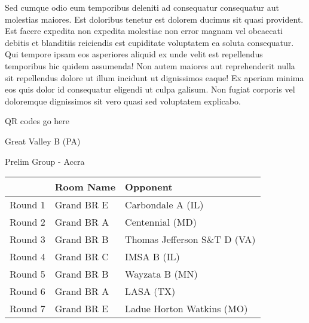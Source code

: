 \documentclass{article}%
\begin{document}
\newline%
Sed cumque odio eum temporibus deleniti ad consequatur consequatur aut molestias maiores. Est doloribus tenetur est dolorem ducimus sit quasi provident. Est facere expedita non expedita molestiae non error magnam vel obcaecati debitis et blanditiis reiciendis est cupiditate voluptatem ea soluta consequatur. Qui tempore ipsam eos asperiores aliquid ex unde velit est repellendus temporibus hic quidem assumenda!\newline%
\newline%
Non autem maiores aut reprehenderit nulla sit repellendus dolore ut illum incidunt ut dignissimos eaque! Ex aperiam minima eos quis dolor id consequatur eligendi ut culpa galisum. Non fugiat corporis vel doloremque dignissimos sit vero quasi sed voluptatem explicabo.\newline%
\newline%
%
\vspace*{30pt}%
\begin{center}%
\begin{Huge}%
QR codes go here%
\end{Huge}%
\end{center}%
\newpage%
%
\begin{center}%
\begin{Huge}%
Great Valley B (PA)%
\end{Huge}%
\vspace*{8pt}%
\linebreak%
\begin{Large}%
Prelim Group {-} Accra%
\end{Large}%
\end{center}%
\begin{tabularx}{\textwidth}{|c|Y|Y|}%
\hline%
&Room Name&Opponent\\%
\hline%
Round 1&Grand BR E&Carbondale A (IL)\\%
Round 2&Grand BR A&Centennial (MD)\\%
Round 3&Grand BR B&Thomas Jefferson S\&T D (VA)\\%
Round 4&Grand BR C&IMSA B (IL)\\%
Round 5&Grand BR B&Wayzata B (MN)\\%
Round 6&Grand BR A&LASA (TX)\\%
Round 7&Grand BR E&Ladue Horton Watkins (MO)\\%
\hline%
\end{tabularx}%
\vspace*{8pt}%
\linebreak%
\end{document}
